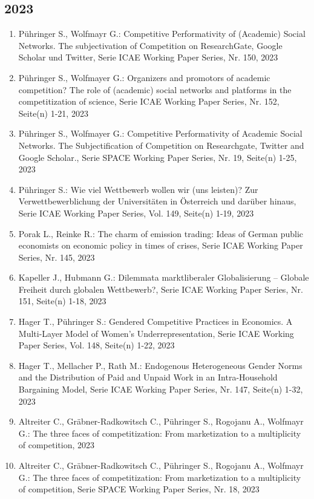 \subsection*{2023}
\begin{enumerate}
    	 \item Pühringer S., Wolfmayr G.: Competitive Performativity of (Academic) Social Networks. The subjectivation of Competition on ResearchGate, Google Scholar und Twitter, Serie ICAE Working Paper Series, Nr. 150, 2023
	 \item Pühringer S., Wolfmayer G.: Organizers and promotors of academic competition? The role of (academic) social networks and platforms in the competitization of science, Serie ICAE Working Paper Series, Nr. 152, Seite(n) 1-21, 2023
	 \item Pühringer S., Wolfmayer G.: Competitive Performativity of Academic Social Networks. The Subjectification of Competition on Researchgate, Twitter and Google Scholar., Serie SPACE Working Paper Series, Nr. 19, Seite(n) 1-25, 2023
	 \item Pühringer S.: Wie viel Wettbewerb wollen wir (uns leisten)? Zur Verwettbewerblichung der Universitäten in Österreich und darüber hinaus, Serie ICAE Working Paper Series, Vol. 149, Seite(n) 1-19, 2023
	 \item Porak L., Reinke R.: The charm of emission trading: Ideas of German public economists on economic policy in times of crises, Serie ICAE Working Paper Series, Nr. 145, 2023
	 \item Kapeller J., Hubmann G.: Dilemmata marktliberaler Globalisierung – Globale Freiheit durch globalen Wettbewerb?, Serie ICAE Working Paper Series, Nr. 151, Seite(n) 1-18, 2023
	 \item Hager T., Pühringer S.: Gendered Competitive Practices in Economics. A Multi-Layer Model of Women’s Underrepresentation, Serie ICAE Working Paper Series, Vol. 148, Seite(n) 1-22, 2023
	 \item Hager T., Mellacher P., Rath M.: Endogenous Heterogeneous Gender Norms and the Distribution of Paid and Unpaid Work in an Intra-Household Bargaining Model, Serie ICAE Working Paper Series, Nr. 147, Seite(n) 1-32, 2023
	 \item Altreiter C., Gräbner-Radkowitsch C., Pühringer S., Rogojanu A., Wolfmayr G.: The three faces of competitization: From marketization to a multiplicity of competition, 2023
	 \item Altreiter C., Gräbner-Radkowitsch C., Pühringer S., Rogojanu A., Wolfmayr G.: The three faces of competitization: From marketization to a multiplicity of competition, Serie SPACE Working Paper Series, Nr. 18, 2023
\end{enumerate}
